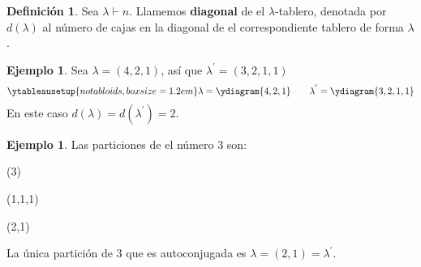 \documentclass[12pt]{book}
\theoremstyle{definition}
\newtheorem{definition}[theorem]{Definición}
\newtheorem{example}[theorem]{Ejemplo}
\newcounter{in}
\newcounter{ini}
\begin{document}
\begin{definition}
  Sea $\lambda\vdash n$. Llamemos \textbf{diagonal} de el
  $\lambda$-tablero, denotada por $d(\lambda)$ al número de
  cajas en la diagonal de el correspondiente tablero de forma $\lambda$.
\end{definition}

\begin{example}
  Sea $\lambda=(4,2,1)$, así que $\lambda^{'}=(3,2,1,1)$
  \begin{equation*}
    \ytableausetup{notabloids,boxsize=1.2em} 
    \lambda=\ydiagram{4,2,1} \qquad
    \lambda^{'}=\ydiagram{3,2,1,1}
  \end{equation*}
  En este caso $d(\lambda)=d(\lambda^{'})=2$.
\end{example}

\begin{example}Las particiones de el número 3 son:
  \begin{center}
    \begin{minipage}[h]{0.3\linewidth}
      \centering {}

      (3)
    \end{minipage}
    \begin{minipage}[h]{0.3\linewidth}
      \centering {}

      (1,1,1)
    \end{minipage}
    \begin{minipage}[h]{0.3\linewidth}
      \centering {}
      
      (2,1)
    \end{minipage}
  \end{center}
 La única partición de 3 que es autoconjugada es $\lambda=(2,1)=\lambda^{'}$.
\end{example}
\end{document}
